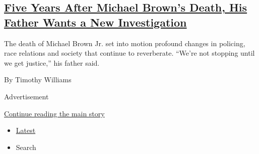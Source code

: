 \begin{enumerate}
{  \subsection{\texorpdfstring{\href{/2019/08/09/us/ferguson-michael-brown.html}{Five
  Years After Michael Brown's Death, His Father Wants a New
  Investigation}}{Five Years After Michael Brown's Death, His Father Wants a New Investigation}}\label{five-years-after-michael-browns-death-his-father-wants-a-new-investigation}}

  The death of Michael Brown Jr. set into motion profound changes in
  policing, race relations and society that continue to reverberate.
  ``We're not stopping until we get justice,'' his father said.

  By Timothy Williams
\end{enumerate}

Advertisement

\protect\hyperlink{after-mid1}{Continue reading the main story}

\begin{itemize}
\tightlist
\item
  \protect\hyperlink{stream-panel}{Latest}
\item
  Search
\end{itemize}

